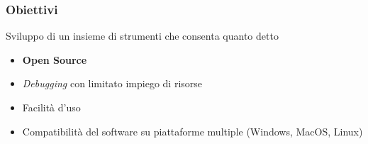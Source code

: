 \documentclass[aspectratio=169,
]{beamer}
\begin{document}
    \begin{frame}
        \frametitle{Obiettivi}
        
        Sviluppo di un insieme di strumenti che consenta quanto detto
        \begin{itemize}
            \item <1-> \textbf{Open Source}
            \item <2-> \textit{Debugging} con limitato impiego di risorse
            \item <3-> Facilità d'uso
            \item <4-> Compatibilità del software su piattaforme multiple (Windows, MacOS, Linux)
        \end{itemize}
    \end{frame}

%
\end{document}
